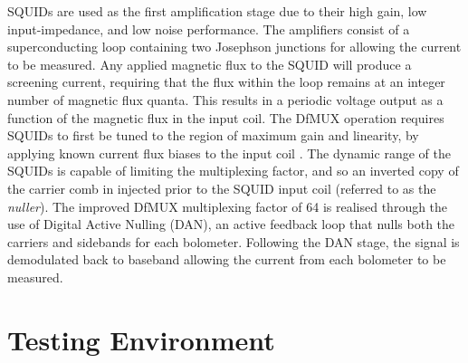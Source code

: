 \documentclass[iop]{emulateapj}
\begin{document}
SQUIDs are used as the first amplification stage due to their high gain, low input-impedance, and low noise performance.  The amplifiers consist of a superconducting loop containing two Josephson junctions for allowing the current to be measured.  Any applied magnetic flux to the SQUID will produce a screening current, requiring that the flux within the loop remains at an integer number of magnetic flux quanta.  This results in a periodic voltage output as a function of the magnetic flux in the input coil.  The DfMUX operation requires SQUIDs to first be tuned to the region of maximum gain and linearity, by applying known current flux biases to the input coil \citep{bender_digital_2014}.  The dynamic range of the SQUIDs is capable of limiting the multiplexing factor, and so an inverted copy of the carrier comb in injected prior to the SQUID input coil (referred to as the \textit{nuller}).  The improved DfMUX multiplexing factor of 64 is realised through the use of Digital Active Nulling (DAN), an active feedback loop that nulls both the carriers and sidebands for each bolometer.  Following the DAN stage, the signal is demodulated back to baseband allowing the current from each bolometer to be measured.



\section{Testing Environment}
\label{testing_section}
\end{document}
